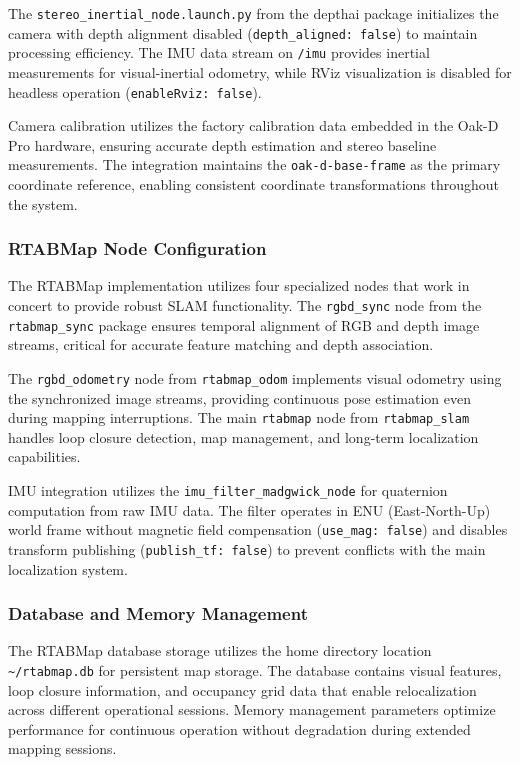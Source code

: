 The \texttt{stereo\_inertial\_node.launch.py} from the depthai package initializes the camera with depth alignment disabled (\texttt{depth\_aligned: false}) to maintain processing efficiency. The IMU data stream on \texttt{/imu} provides inertial measurements for visual-inertial odometry, while RViz visualization is disabled for headless operation (\texttt{enableRviz: false}).

Camera calibration utilizes the factory calibration data embedded in the Oak-D Pro hardware, ensuring accurate depth estimation and stereo baseline measurements. The integration maintains the \texttt{oak-d-base-frame} as the primary coordinate reference, enabling consistent coordinate transformations throughout the system.

\subsubsection{RTABMap Node Configuration}

The RTABMap implementation utilizes four specialized nodes that work in concert to provide robust SLAM functionality. The \texttt{rgbd\_sync} node from the \texttt{rtabmap\_sync} package ensures temporal alignment of RGB and depth image streams, critical for accurate feature matching and depth association.

The \texttt{rgbd\_odometry} node from \texttt{rtabmap\_odom} implements visual odometry using the synchronized image streams, providing continuous pose estimation even during mapping interruptions. The main \texttt{rtabmap} node from \texttt{rtabmap\_slam} handles loop closure detection, map management, and long-term localization capabilities.

IMU integration utilizes the \texttt{imu\_filter\_madgwick\_node} for quaternion computation from raw IMU data. The filter operates in ENU (East-North-Up) world frame without magnetic field compensation (\texttt{use\_mag: false}) and disables transform publishing (\texttt{publish\_tf: false}) to prevent conflicts with the main localization system.

\subsubsection{Database and Memory Management}

The RTABMap database storage utilizes the home directory location \texttt{\textasciitilde/rtabmap.db} for persistent map storage. The database contains visual features, loop closure information, and occupancy grid data that enable relocalization across different operational sessions. Memory management parameters optimize performance for continuous operation without degradation during extended mapping sessions.

